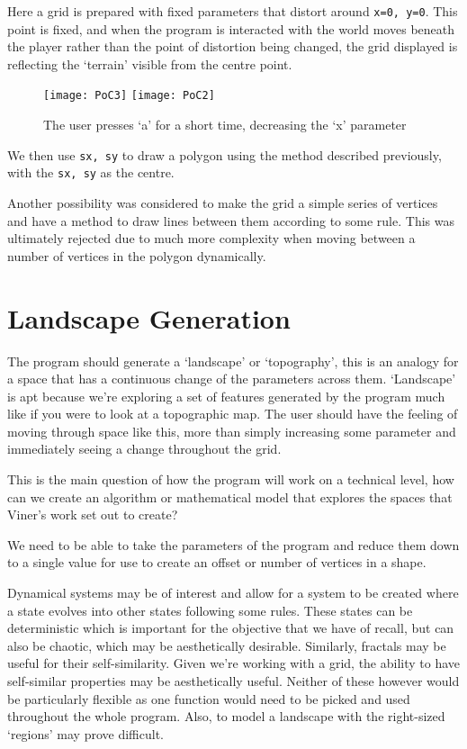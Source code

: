 Here a grid is prepared with fixed parameters that distort around
\verb|x=0, y=0|. This point is fixed, and when the program is interacted with
the world moves beneath the player rather than the point of distortion being
changed, the grid displayed is reflecting the `terrain' visible from the centre
point.

\begin{figure}[H]
\centering
\texttt{[image: PoC3]}
\hspace*{0.5cm}
\texttt{[image: PoC2]}
\caption{The user presses `a' for a short time, decreasing the `x' parameter}
\label{demomovement}
\end{figure}

We then use \verb|sx, sy| to draw a polygon using the method described
previously, with the \verb|sx, sy| as the centre.

Another possibility was considered to make the grid a simple series of vertices
and have a method to draw lines between them according to some rule. This was
ultimately rejected due to much more complexity when moving between a number of
vertices in the polygon dynamically.

\section{Landscape Generation}
\label{landgen}
The program should generate a `landscape' or `topography', this is an analogy for
a space that has a continuous change of the parameters across them. `Landscape'
is apt because we're exploring a set of features generated by the program much
like if you were to look at a topographic map. The user should have the feeling
of moving through space like this, more than simply increasing some parameter
and immediately seeing a change throughout the grid.

This is the main question of how the program will work on a technical level, how
can we create an algorithm or mathematical model that explores the spaces that
Viner's work set out to create?

We need to be able to take the parameters of the program and reduce them down to
a single value for use to create an offset or number of vertices in a shape.

Dynamical systems may be of interest and allow for a system to be created where
a state evolves into other states following some rules. These states can be
deterministic which is important for the objective that we have of recall, but
can also be chaotic, which may be aesthetically desirable. Similarly, fractals
may be useful for their self-similarity. Given we're working with a grid, the
ability to have self-similar properties may be aesthetically useful. Neither of
these however would be particularly flexible as one function would need to be
picked and used throughout the whole program. Also, to model a landscape with
the right-sized `regions' may prove difficult.

